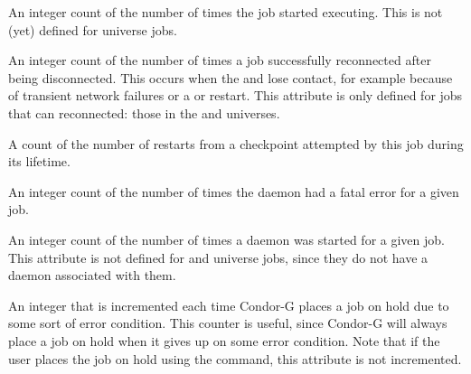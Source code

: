 \begin{description}
\item[\AdAttr{NumJobStarts}:]  An integer count of the number of times the
  job started executing.
  This is not (yet) defined for  universe jobs.

\item[\AdAttr{NumJobReconnects}:]  An integer count of the number of times a
  job successfully reconnected after being disconnected.
  This occurs when the
   and  lose contact,
  for example because of
  transient network failures or a  or 
  restart.
  This attribute is only defined for jobs that can reconnected:
  those in the  and  universes.

\item[\AdAttr{NumRestarts}:]  A count of the number of restarts from a
checkpoint attempted by this job during its lifetime.

\item[\AdAttr{NumShadowExceptions}:]  An integer count of the number of
  times the  daemon had a fatal error for a given job.

\item[\AdAttr{NumShadowStarts}:]  An integer count of the number of
  times a  daemon was started for a given job.
  This attribute is not defined for  and
   universe jobs, since
  they do not have a  daemon associated with them.

\item[\AdAttr{NumSystemHolds}:]   An integer that is incremented each time
Condor-G places a job on hold due to some sort of error condition.  This
counter is useful, since Condor-G will always place a job on hold when it
gives up on some error condition.  Note that if the user places the job
on hold using the  command, this attribute is not incremented.


\end{description}

